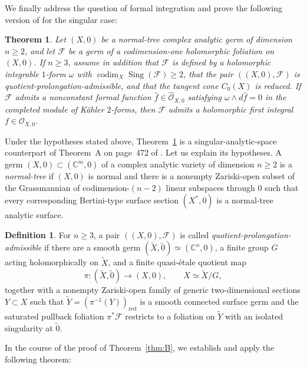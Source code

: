 \documentclass[11pt,twoside]{amsart}
\newcommand{\C}{\mathbb C}
\newcommand{\OO}{\mathcal O}
\newcommand{\F}{\mathcal F}
\DeclareMathOperator{\Sing}{Sing}
\DeclareMathOperator{\codim}{codim}
\newtheorem{mainthm}{Theorem}
\theoremstyle{definition}
\newtheorem{defi}{Definition}
\begin{document}
We finally address the question of formal integration and prove the following version of \cite{MatteiMoussu1980,Malgrange1976} for the singular case:

\begin{mainthm}\label{thm:D}\normalfont
Let $(X,0)$ be a normal-tree complex analytic germ of dimension $n\geq2$,
and let $\F$ be a germ of a codimension-one holomorphic foliation on
$(X,0)$. If $n\geq3$, assume in addition that $\F$ is defined by a
holomorphic integrable $1$-form $\omega$ with
$\codim_X\Sing(\F)\geq2$, that the pair $((X,0),\F)$ is
quotient-prolongation-admissible, and that the tangent cone $C_0(X)$ is
reduced. If $\F$ admits a nonconstant formal function
$\hat f\in\widehat{\OO}_{X,0}$ satisfying
$\omega\wedge d\hat f=0$ in the completed module of K\"ahler
$2$-forms, then $\F$ admits a holomorphic first
integral $f\in\OO_{X,0}$.
\end{mainthm}

Under the hypotheses stated above, Theorem~\ref{thm:D} is a
singular-analytic-space counterpart of Theorem~A on page~472 of
\cite{MatteiMoussu1980}.
Let us explain its hypotheses.
A germ $(X,0)\subset(\C^m,0)$ of a complex analytic variety of dimension
$n\geq2$ is a \textit{normal-tree} if $(X,0)$ is normal and there is a
nonempty Zariski-open
subset of the Grassmannian of codimension-$(n-2)$ linear subspaces through
$0$ such that every corresponding Bertini-type surface section $(X^*,0)$
is a normal-tree analytic surface.

\begin{defi}\label{def:qpa}
For $n\geq3$, a pair $((X,0),\F)$ is called
\textit{quotient-prolongation-admissible} if there are a smooth germ
$(\widetilde X,\widetilde0)\simeq(\C^n,0)$, a finite group $G$ acting
holomorphically on $\widetilde X$, and a finite quasi-\'etale quotient map
\[
 \pi:(\widetilde X,\widetilde0)\longrightarrow(X,0),
 \qquad X\simeq\widetilde X/G,
\]
together with a nonempty Zariski-open family of generic two-dimensional
sections $Y\subset X$ such that
$\widetilde Y=(\pi^{-1}(Y))_{\mathrm{red}}$ is a smooth connected surface
germ and the saturated pullback foliation $\pi^*\F$ restricts to a foliation
on $\widetilde Y$ with an isolated singularity at $\widetilde0$.
\end{defi}

In the course of the proof of Theorem~\ref{thm:B}, we establish and apply the following theorem:
\end{document}
